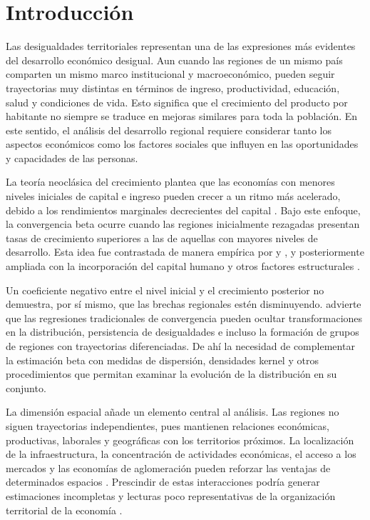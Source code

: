 \section{Introducción}

Las desigualdades territoriales representan una de las expresiones más evidentes
del desarrollo económico desigual. Aun cuando las regiones de un mismo país
comparten un mismo marco institucional y macroeconómico, pueden seguir
trayectorias muy distintas en términos de ingreso, productividad, educación,
salud y condiciones de vida. Esto significa que el crecimiento del producto por
habitante no siempre se traduce en mejoras similares para toda la población.
En este sentido, el análisis del desarrollo regional requiere considerar tanto los
aspectos económicos como los factores sociales que influyen en las oportunidades
y capacidades de las personas.

La teoría neoclásica del crecimiento plantea que las economías con menores
niveles iniciales de capital e ingreso pueden crecer a un ritmo más acelerado,
debido a los rendimientos marginales decrecientes del capital
\parencite{solow1956}. Bajo este enfoque, la convergencia beta ocurre cuando las
regiones inicialmente rezagadas presentan tasas de crecimiento superiores a las
de aquellas con mayores niveles de desarrollo. Esta idea fue contrastada de
manera empírica por \textcite{barro_sala1991} y
\textcite{barro_sala1992}, y posteriormente ampliada con la incorporación del
capital humano y otros factores estructurales
\parencite{mankiw1992}.

Un coeficiente negativo entre el nivel inicial y el crecimiento posterior no
demuestra, por sí mismo, que las brechas regionales estén disminuyendo.
\textcite{quah1993} advierte que las regresiones tradicionales de convergencia
pueden ocultar transformaciones en la distribución, persistencia de
desigualdades e incluso la formación de grupos de regiones con trayectorias
diferenciadas. De ahí la necesidad de complementar la estimación beta con
medidas de dispersión, densidades kernel y otros procedimientos que permitan
examinar la evolución de la distribución en su conjunto.

La dimensión espacial añade un elemento central al análisis. Las regiones no
siguen trayectorias independientes, pues mantienen relaciones económicas,
productivas, laborales y geográficas con los territorios próximos. La
localización de la infraestructura, la concentración de actividades
económicas, el acceso a los mercados y las economías de aglomeración pueden
reforzar las ventajas de determinados espacios \parencite{krugman1991}.
Prescindir de estas interacciones podría generar estimaciones incompletas y
lecturas poco representativas de la organización territorial de la economía
\parencite{anselin1988,rey_montouri1999}.

